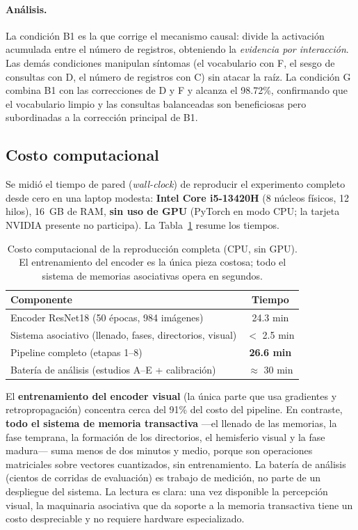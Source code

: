 \paragraph{Análisis.}
La condición B1 es la que corrige el mecanismo causal: divide la activación acumulada entre el número de registros, obteniendo la \textit{evidencia por interacción}.
Las demás condiciones manipulan síntomas (el vocabulario con F, el sesgo de consultas con D, el número de registros con C) sin atacar la raíz.
La condición G combina B1 con las correcciones de D y F y alcanza el 98.72\%, confirmando que el vocabulario limpio y las consultas balanceadas son beneficiosas pero subordinadas a la corrección principal de B1.

\subsection{Costo computacional}
\label{sec:costo}

Se midió el tiempo de pared (\textit{wall-clock}) de reproducir el experimento completo desde cero en una laptop modesta: \textbf{Intel Core i5-13420H} (8 núcleos físicos, 12 hilos), 16~GB de RAM, \textbf{sin uso de GPU} (PyTorch en modo CPU; la tarjeta NVIDIA presente no participa).
La Tabla~\ref{tab:costo} resume los tiempos.

\begin{table}[H]
    \centering
    \caption{Costo computacional de la reproducción completa (CPU, sin GPU). El entrenamiento del encoder es la única pieza costosa; todo el sistema de memorias asociativas opera en segundos.}
    \label{tab:costo}
    \small
    \begin{tabular}{lc}
        \toprule
        Componente & Tiempo \\
        \midrule
        Encoder ResNet18 (50 épocas, 984 imágenes)   & 24.3 min \\
        Sistema asociativo (llenado, fases, directorios, visual) & $<$ 2.5 min \\
        Pipeline completo (etapas 1--8)               & \textbf{26.6 min} \\
        \midrule
        Batería de análisis (estudios A--E + calibración) & $\approx$ 30 min \\
        \bottomrule
    \end{tabular}
\end{table}

El \textbf{entrenamiento del encoder visual} (la única parte que usa gradientes y retropropagación) concentra cerca del 91\% del costo del pipeline.
En contraste, \textbf{todo el sistema de memoria transactiva} —el llenado de las memorias, la fase temprana, la formación de los directorios, el hemisferio visual y la fase madura— suma menos de dos minutos y medio, porque son operaciones matriciales sobre vectores cuantizados, sin entrenamiento.
La batería de análisis (cientos de corridas de evaluación) es trabajo de medición, no parte de un despliegue del sistema.
La lectura es clara: una vez disponible la percepción visual, la maquinaria asociativa que da soporte a la memoria transactiva tiene un costo despreciable y no requiere hardware especializado.
